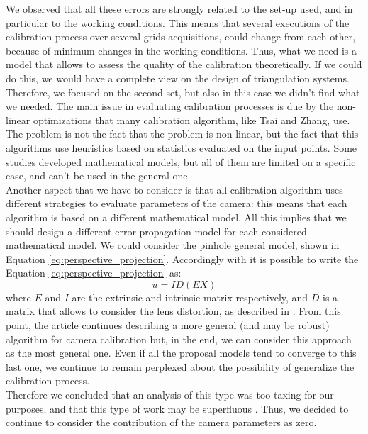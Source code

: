 We observed that all these errors are strongly related to the set-up used, and in particular to the working conditions. This means that several executions of the calibration process over several grids acquisitions, could change from each other, because of minimum changes in the working conditions. Thus, what we need is a model that allows to assess the quality of the calibration theoretically. If we could do this, we would have a complete view on the design of triangulation systems. Therefore, we focused on the second set, but also in this case we didn't find what we needed. The main issue in evaluating calibration processes is due by the non-linear optimizations that many calibration algorithm, like Tsai and Zhang, use. The problem is not the fact that the problem is non-linear, but the fact that this algorithms use heuristics based on statistics evaluated on the input points. Some studies developed mathematical models, but all of them are limited on a specific case, and can't be used in the general one. \\

Another aspect that we have to consider is that all calibration algorithm uses different strategies to evaluate parameters of the camera: this means that each algorithm is based on a different mathematical model. All this implies that we should design a different error propagation model for each considered mathematical model. 
We could consider the pinhole general model, shown in Equation \ref{eq:perspective_projection}. Accordingly with \cite{andersson2008calibration} it is possible to write the Equation \ref{eq:perspective_projection} as:
  \begin{equation}
    u = ID(EX)
  \end{equation}
where $E$ and $I$ are the extrinsic and intrinsic matrix respectively, and $D$ is a matrix that allows to consider the lens distortion, as described in \cite{DBLP:journals/corr/cs-CV-0308003}. From this point, the article continues describing a more general (and may be robust) algorithm for camera calibration but, in the end, we can consider this approach as the most general one. Even if all the proposal models tend to converge to this last one, we continue to remain perplexed about the possibility of generalize the calibration process. \\

Therefore we concluded that an analysis of this type was too taxing for our purposes, and that this type of work may be superfluous \cite{5944307}. Thus, we decided to continue to consider the contribution of the camera parameters as zero.
